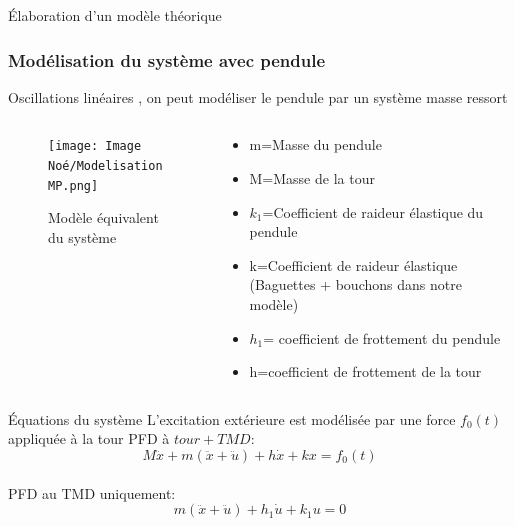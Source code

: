 \documentclass{beamer}
\begin{document}
	\begin{frame}{Élaboration d'un modèle théorique}
		\frametitle{Modélisation du système avec pendule}
		Oscillations linéaires , on peut modéliser le pendule par un système masse ressort
		\begin{columns}
			\begin{column}{0.5\textwidth}
				\begin{figure}
					\centering
					\texttt{[image: Image Noé/ModelisationMP.png]}
					\caption{Modèle équivalent du système}
				\end{figure}
			\end{column}
			\begin{column}{0.5\textwidth}
				\begin{itemize}
					\item m=Masse du pendule
					\item M=Masse de la tour
					\item $k_{1}$=Coefficient de raideur élastique du pendule
					\item k=Coefficient de raideur élastique (Baguettes + bouchons dans notre modèle)
					\item $h_{1}$= coefficient de frottement du pendule 
					\item h=coefficient de frottement de la tour
				\end{itemize}	
			\end{column}
		\end{columns}
		
	\end{frame}


	\begin{frame}{Équations du système}
		L'excitation extérieure est modélisée par une force $f_{0}(t)$ appliquée à la tour\vspace{12pt}
		PFD à ${tour + TMD}$:
		\begin{equation}\label{key}
			M\ddot{x} + m(\ddot{x}+\ddot{u}) +h\dot{x} + kx = f_{0}(t)
		\end{equation}\\
		\vspace{12pt}
		PFD  au TMD uniquement:
		\begin{equation}
			m(\ddot{x}+\ddot{u}) + h_{1}\dot{u} + k_{1}u = 0
		\end{equation}\\
	
		
	\end{frame}
	
\end{document}
